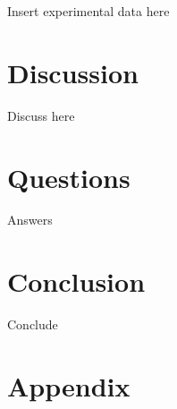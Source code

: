 \documentclass{article}
\begin{document}
Insert experimental data here


\section{Discussion}

Discuss here


\section{Questions}

Answers

\section{Conclusion}

Conclude


\section{Appendix}
\end{document}
